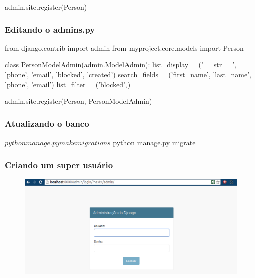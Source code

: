\documentclass[aspectratio=169]{beamer}
\begin{document}
{\begin{frame}[fragile]
\begin{pythoncode}
admin.site.register(Person)
\end{pythoncode}

\end{frame}

\begin{frame}[fragile]\frametitle{Editando o admins.py}

\begin{pythoncode}
from django.contrib import admin
from myproject.core.models import Person

class PersonModelAdmin(admin.ModelAdmin):
    list_display = ('__str__', 'phone', 'email',
                    'blocked', 'created')
    search_fields = ('first_name', 'last_name', 'phone', 'email')
    list_filter = ('blocked',)

admin.site.register(Person, PersonModelAdmin)
\end{pythoncode}

\end{frame}

\begin{frame}[fragile]\frametitle{Atualizando o banco}

\begin{bashcode}
$ python manage.py makemigrations
$ python manage.py migrate
\end{bashcode}

\end{frame}

\begin{frame}[fragile]\frametitle{Criando um super usuário}


\end{frame}


\begin{frame}

    \begin{figure}[h]
      \centering
        \includegraphics[width=.8\paperwidth]{img/admin1.png}
    \end{figure}


\end{frame}}
\end{document}
